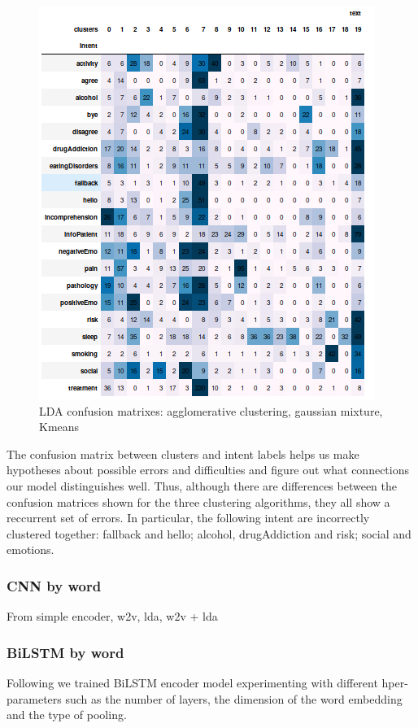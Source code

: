 \documentclass[11pt]{article}
\begin{document}
\begin{figure}[h]
	\includegraphics[scale=0.28]{lda_km_cm.png}
	\caption{LDA confusion matrixes: agglomerative clustering, gaussian mixture, Kmeans}
\label{lda_gm_cm}
\end{figure}
\FloatBarrier

The confusion matrix between clusters and intent labels helps us make
hypotheses about possible errors and difficulties and figure out what
connections our model distinguishes well. Thus, although there are
differences between the confusion matrices shown for the three
clustering algorithms, they all show a reccurrent set of errors. In
particular, the following intent are incorrectly clustered together:
fallback and hello; alcohol, drugAddiction and risk; social and
emotions.

\subsubsection{CNN by word}
From simple encoder, w2v, lda, w2v + lda

\subsubsection{BiLSTM by word}

Following  we trained BiLSTM encoder model experimenting with different hper-parameters such as  the number of layers, the dimension of the word embedding and the type of pooling.
\end{document}
